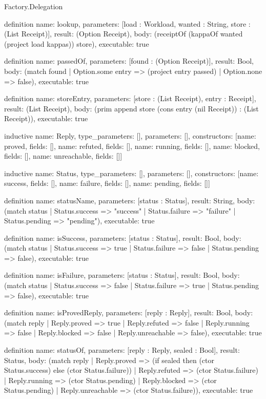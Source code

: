\begin{lexlean}{Factory.Delegation}
\begin{semanticmodule}
definition{
  name: lookup,
  parameters: [load : Workload, wanted : String, store : (List Receipt)],
  result: (Option Receipt),
  body: (receiptOf (kappaOf wanted (project load kappas)) store),
  executable: true
}

definition{
  name: passedOf,
  parameters: [found : (Option Receipt)],
  result: Bool,
  body: (match found
    | Option.some entry => (project entry passed)
    | Option.none => false),
  executable: true
}

definition{
  name: storeEntry,
  parameters: [store : (List Receipt), entry : Receipt],
  result: (List Receipt),
  body: (prim append store (cons entry (nil Receipt)) : (List Receipt)),
  executable: true
}

inductive{
  name: Reply,
  type_parameters: [],
  parameters: [],
  constructors: [{name: proved, fields: []}, {name: refuted, fields: []}, {name: running, fields: []}, {name: blocked, fields: []}, {name: unreachable, fields: []}]
}

inductive{
  name: Status,
  type_parameters: [],
  parameters: [],
  constructors: [{name: success, fields: []}, {name: failure, fields: []}, {name: pending, fields: []}]
}

definition{
  name: statusName,
  parameters: [status : Status],
  result: String,
  body: (match status
    | Status.success => "success"
    | Status.failure => "failure"
    | Status.pending => "pending"),
  executable: true
}

definition{
  name: isSuccess,
  parameters: [status : Status],
  result: Bool,
  body: (match status
    | Status.success => true
    | Status.failure => false
    | Status.pending => false),
  executable: true
}

definition{
  name: isFailure,
  parameters: [status : Status],
  result: Bool,
  body: (match status
    | Status.success => false
    | Status.failure => true
    | Status.pending => false),
  executable: true
}

definition{
  name: isProvedReply,
  parameters: [reply : Reply],
  result: Bool,
  body: (match reply
    | Reply.proved => true
    | Reply.refuted => false
    | Reply.running => false
    | Reply.blocked => false
    | Reply.unreachable => false),
  executable: true
}

definition{
  name: statusOf,
  parameters: [reply : Reply, sealed : Bool],
  result: Status,
  body: (match reply
    | Reply.proved => (if sealed then (ctor Status.success) else (ctor Status.failure))
    | Reply.refuted => (ctor Status.failure)
    | Reply.running => (ctor Status.pending)
    | Reply.blocked => (ctor Status.pending)
    | Reply.unreachable => (ctor Status.failure)),
  executable: true
}


\end{semanticmodule}
\end{lexlean}
